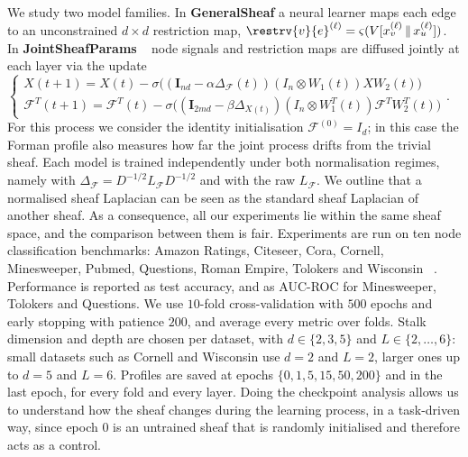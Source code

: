 We study two model families. In \textbf{GeneralSheaf} a neural learner maps each
edge to an unconstrained $d\times d$ restriction map,
$\restrv{v}{e}^{(\ell)} = \varsigma(V[x_v^{(\ell)} \,\|\, x_u^{(\ell)}])$. In
\textbf{JointSheafParams} ~\cite{caralt2024jointdiffusionprocessesinductive} node signals and
restriction maps are diffused jointly at each layer via the update $\begin{cases}
X(t+1) = X(t) - \sigma\big((\mathbf{I}_{nd} - \alpha \Delta_{\mathcal{F}}(t))(I_n \otimes W_1(t))XW_2(t)\big) \\
\mathcal{F}^T(t+1) = \mathcal{F}^T(t) - \sigma\big((\mathbf{I}_{2md} - \beta \Delta_{X(t)})(I_n \otimes W_1^T(t))\mathcal{F}^TW_2^T(t)\big)
\end{cases}$. For this process we consider the
identity initialisation $\mathcal{F}^{(0)} = I_d$; in this case the Forman profile also measures how far the
joint process drifts from the trivial sheaf. 
Each model is trained independently under both
normalisation regimes, namely with
$\Delta_{\mathcal{F}} = D^{-1/2}L_{\mathcal{F}}D^{-1/2}$ and
with the raw $L_{\mathcal{F}}$.
We outline that a normalised sheaf Laplacian can be seen as the standard sheaf Laplacian of another sheaf.
As a consequence, all our experiments lie within the same sheaf space, and the comparison between them is fair.
Experiments are run on ten node classification benchmarks: Amazon Ratings,
Citeseer, Cora, Cornell, Minesweeper, Pubmed, Questions, Roman Empire, Tolokers
and Wisconsin  ~\cite{sen2008collective,tang2009social,pei2020geomgcn,platonov2023critical}.
Performance is reported as
test accuracy, and as AUC-ROC for Minesweeper, Tolokers and Questions. We use $10$-fold
cross-validation with $500$ epochs and early stopping with patience $200$, and
average every metric over folds.
Stalk dimension and depth are chosen per
dataset, with $d \in \{2,3,5\}$ and $L \in \{2,\dots,6\}$: small datasets such
as Cornell and Wisconsin use $d=2$ and $L=2$, larger ones up to $d=5$ and $L=6$.
Profiles are saved at epochs $\{0,1,5,15,50,200\}$ and in the last
epoch, for every fold and every layer.
Doing the checkpoint analysis allows us to understand how the sheaf changes during the learning process, in a task-driven way, since epoch $0$ is an untrained sheaf that is randomly initialised and therefore acts as a control.

